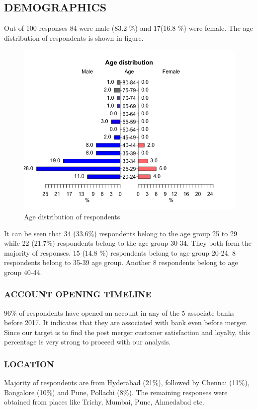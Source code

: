 \documentclass[a4paper, 12pt]{extarticle}
\begin{document}
{\subsection{DEMOGRAPHICS}
Out of 100 responses 84 were male (83.2 \%) and 17(16.8 \%) were female. The age distribution of respondents is shown in figure.
\begin{figure}[H]
\centering
\includegraphics[scale=0.7]{age.png}
\caption{Age distribution of respondents}
\end{figure}
It can be seen that 34 (33.6\%) respondents belong to the age group 25 to 29 while 22 (21.7\%) respondents belong to the age group 30-34. They both form the majority of responses. 15 (14.8 \%) respondents belong to age group 20-24. 8 respondents belong to 35-39 age group. Another 8 respondents belong to age group 40-44.

\subsubsection{ACCOUNT OPENING TIMELINE}
96\% of respondents have opened an account in any of the 5 associate banks before 2017. It indicates that they are associated with bank even before merger. Since our target is to find the post merger customer satisfaction and loyalty, this percentage is very strong to proceed with our analysis.

\subsubsection{LOCATION}
Majority of respondents are from Hyderabad (21\%), followed by Chennai (11\%), Bangalore (10\%) and Pune, Pollachi (8\%). The remaining responses were obtained from places like  Trichy, Mumbai, Pune, Ahmedabad etc.

}
\end{document}
